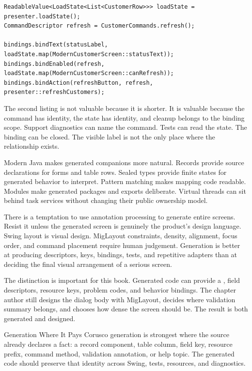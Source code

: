 \begin{lstlisting}[caption={The same ownership expressed through values and command metadata.}]
ReadableValue<LoadState<List<CustomerRow>>> loadState = presenter.loadState();
CommandDescriptor refresh = CustomerCommands.refresh();

bindings.bindText(statusLabel, loadState.map(ModernCustomerScreen::statusText));
bindings.bindEnabled(refresh, loadState.map(ModernCustomerScreen::canRefresh));
bindings.bindAction(refreshButton, refresh, presenter::refreshCustomers);
\end{lstlisting}

The second listing is not valuable because it is shorter. It is valuable because the command has identity, the state has identity, and cleanup belongs to the binding scope. Support diagnostics can name the command. Tests can read the state. The binding can be closed. The visible label is not the only place where the relationship exists.

Modern Java makes generated companions more natural. Records provide source declarations for forms and table rows. Sealed types provide finite states for generated behavior to interpret. Pattern matching makes mapping code readable. Modules make generated packages and exports deliberate. Virtual threads can sit behind task services without changing their public ownership model.

There is a temptation to use annotation processing to generate entire screens. Resist it unless the generated screen is genuinely the product's design language. Swing layout is visual design. MigLayout constraints, density, alignment, focus order, and command placement require human judgement. Generation is better at producing descriptors, keys, bindings, tests, and repetitive adapters than at deciding the final visual arrangement of a serious screen.

The distinction is important for this book. Generated code can provide a , field descriptors, resource keys, problem codes, and behavior bindings. The chapter author still designs the dialog body with MigLayout, decides where validation summary belongs, and chooses how dense the screen should be. The result is both generated and designed.

\begin{coruscobox}{Generation Where It Pays}
Corusco generation is strongest where the source already declares a fact: a record component, table column, field key, resource prefix, command method, validation annotation, or help topic. The generated code should preserve that identity across Swing, tests, resources, and diagnostics.
\end{coruscobox}

